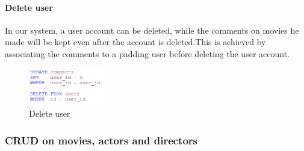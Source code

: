 \begin{CJK*}{UTF8}{gbsn}
\paragraph{Delete user}
In our system, a user account can be deleted, while the comments on movies he made will be kept even after the account is deleted.This is achieved by associating the comments to a padding user before deleting the user account.
\begin{figure}[!htb]
    \centering
    \includegraphics[width=0.3\textwidth]{user_del.png}
    \caption{Delete user}
\end{figure}


\subsubsection{CRUD on movies, actors and directors}

\end{CJK*}
